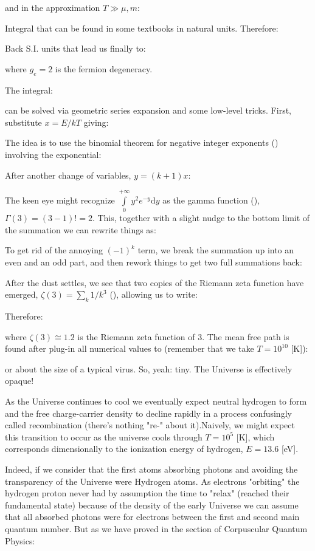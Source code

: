 	and in the approximation $T\gg \mu,m$:
	
	Integral that can be found in some textbooks in natural units. Therefore:
	
	Back S.I. units that lead us finally to:
	
	where $g_e=2$ is the fermion degeneracy.
	
	The integral:
	
	can be solved via geometric series expansion and some low-level tricks. First, substitute $x=E/kT$ giving:
	
	The idea is to use the binomial theorem for negative integer exponents () involving the exponential:
	
	After another change of variables, $y=(k+1)x$:
	
	The keen eye might recognize $\int\limits_0^{+\infty} y^2e^{-y}\mathrm{d}y$ as the gamma function (), $\Gamma(3)=(3-1)!=2$. This, together with a slight nudge to the bottom limit of the summation we can rewrite things as:
	
	To get rid of the annoying $(-1)^k$ term, we break the summation up into an even and an odd part, and then rework things to get two full summations back:
	
	After the dust settles, we see that two copies of the Riemann zeta function have emerged, $\zeta(3) = \sum_k 1/k^3$ (), allowing us to write:
	
	Therefore:
	
	where $\zeta(3)\cong 1.2$ is the Riemann zeta function of $3$. The mean free path is found after plug-in all numerical values to (remember that we take $T=10^{10}$ [K]):
	
	 or about the size of a typical virus. So, yeah: tiny. The Universe is effectively opaque!
	
	As the Universe continues to cool we eventually expect neutral hydrogen to form and the free charge-carrier density to decline rapidly in a process confusingly called recombination (there's nothing "re-" about it).Naively, we might expect this transition to occur as the universe cools through $T=10^5$ [K], which corresponds dimensionally to the ionization energy of hydrogen, $E=13.6$ [eV]. 
	
	Indeed, if we consider that the first atoms absorbing photons and avoiding the transparency of the Universe were Hydrogen atoms. As electrons "orbiting" the hydrogen proton never had by assumption the time to "relax" (reached their fundamental state) because of the density of the early Universe we can assume that all absorbed photons were for electrons between the first and second main quantum number. But as we have proved in the section of Corpuscular Quantum Physics:
	
